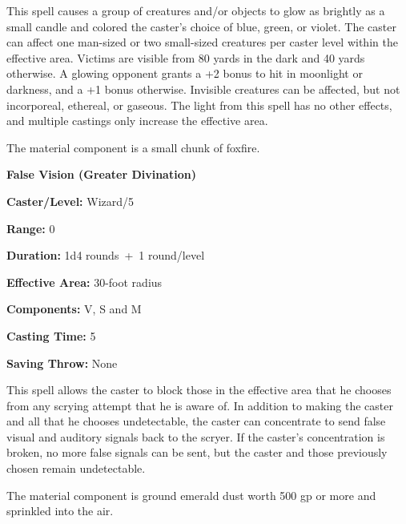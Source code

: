\begin{multicols}{2}
\begin{minipage}{\columnwidth}
\end{minipage}

This spell causes a group of creatures and/or objects to glow as brightly as a small candle and colored the caster's choice of blue, green, or violet.  The caster can affect one man-sized or two small-sized creatures per caster level within the effective area.  Victims are visible from 80 yards in the dark and 40 yards otherwise.  A glowing opponent grants a +2 bonus to hit in moonlight or darkness, and a +1 bonus otherwise.  Invisible creatures can be affected, but not incorporeal, ethereal, or gaseous.  The light from this spell has no other effects, and multiple castings only increase the effective area.

The material component is a small chunk of foxfire.
 
\vspace{1em}

\noindent
\begin{minipage}{\columnwidth}

\noindent \textbf{False Vision (Greater Divination)}

\noindent \textbf{Caster/Level:} Wizard/5

\noindent \textbf{Range:} 0

\noindent \textbf{Duration:} 1d4 rounds~+~1 round/level

\noindent \textbf{Effective Area:} 30-foot radius

\noindent \textbf{Components:} V, S and M

\noindent \textbf{Casting Time:} 5

\noindent \textbf{Saving Throw:} None

\end{minipage}

This spell allows the caster to block those in the effective area that he chooses from any scrying attempt that he is aware of.  In addition to making the caster and all that he chooses undetectable, the caster can concentrate to send false visual and auditory signals back to the scryer.  If the caster's concentration is broken, no more false signals can be sent, but the caster and those previously chosen remain undetectable.  

The material component is ground emerald dust worth 500 gp or more and sprinkled into the air.

\vspace{1em}

\noindent
\begin{minipage}{\columnwidth}


\end{minipage}
\end{multicols}

